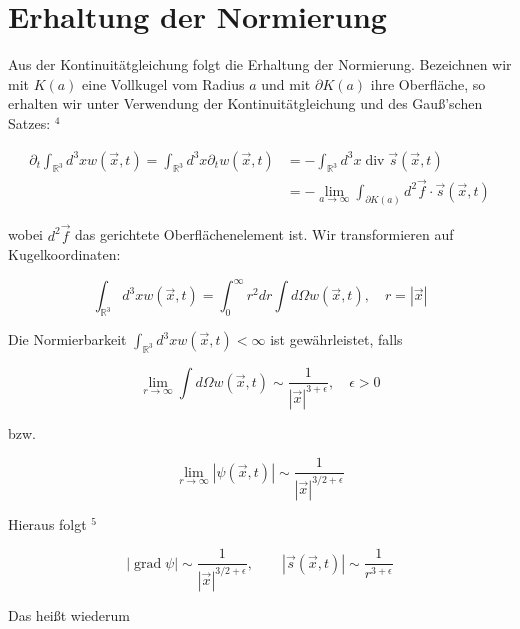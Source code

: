 \documentclass[10pt, letterpaper]{article}
\begin{document}
\section*{Erhaltung der Normierung}
Aus der Kontinuitätgleichung folgt die Erhaltung der Normierung. Bezeichnen wir mit $K(a)$ eine Vollkugel vom Radius $a$ und mit $\partial K(a)$ ihre Oberfläche, so erhalten wir unter Verwendung der Kontinuitätgleichung und des Gauß'schen Satzes: ${ }^{4}$

$$
\begin{aligned}
\partial_{t} \int_{\mathbb{R}^{3}} d^{3} x w(\vec{x}, t)=\int_{\mathbb{R}^{3}} d^{3} x \partial_{t} w(\vec{x}, t) & =-\int_{\mathbb{R}^{3}} d^{3} x \operatorname{div} \vec{s}(\vec{x}, t) \\
& =-\lim _{a \rightarrow \infty} \int_{\partial K(a)} d^{2} \vec{f} \cdot \vec{s}(\vec{x}, t)
\end{aligned}
$$

wobei $d^{2} \vec{f}$ das gerichtete Oberflächenelement ist. Wir transformieren auf Kugelkoordinaten:

$$
\int_{\mathbb{R}^{3}} d^{3} x w(\vec{x}, t)=\int_{0}^{\infty} r^{2} d r \int d \Omega w(\vec{x}, t), \quad r=|\vec{x}|
$$

Die Normierbarkeit $\int_{\mathbb{R}^{3}} d^{3} x w(\vec{x}, t)<\infty$ ist gewährleistet, falls

$$
\lim _{r \rightarrow \infty} \int d \Omega w(\vec{x}, t) \sim \frac{1}{|\vec{x}|^{3+\epsilon}}, \quad \epsilon>0
$$

bzw.

$$
\lim _{r \rightarrow \infty}|\psi(\vec{x}, t)| \sim \frac{1}{|\vec{x}|^{3 / 2+\epsilon}}
$$

Hieraus folgt ${ }^{5}$

$$
|\operatorname{grad} \psi| \sim \frac{1}{|\vec{x}|^{3 / 2+\epsilon}}, \quad \quad|\vec{s}(\vec{x}, t)| \sim \frac{1}{r^{3+\epsilon}}
$$

Das heißt wiederum
\end{document}
